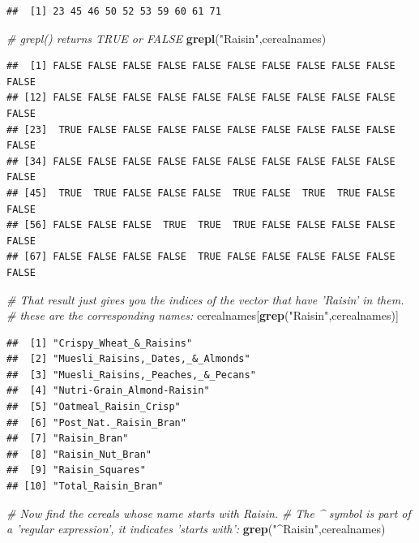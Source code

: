 \documentclass[]{book}
\newenvironment{Shaded}{\begin{snugshade}}{\end{snugshade}}
\newcommand{\CommentTok}[1]{\textcolor[rgb]{0.56,0.35,0.01}{\textit{#1}}}
\newcommand{\KeywordTok}[1]{\textcolor[rgb]{0.13,0.29,0.53}{\textbf{#1}}}
\newcommand{\NormalTok}[1]{#1}
\newcommand{\StringTok}[1]{\textcolor[rgb]{0.31,0.60,0.02}{#1}}
\begin{document}
\begin{verbatim}
##  [1] 23 45 46 50 52 53 59 60 61 71
\end{verbatim}

\begin{Shaded}
\begin{Highlighting}[]
\CommentTok{# grepl() returns TRUE or FALSE}
\KeywordTok{grepl}\NormalTok{(}\StringTok{"Raisin"}\NormalTok{,cerealnames)}
\end{Highlighting}
\end{Shaded}

\begin{verbatim}
##  [1] FALSE FALSE FALSE FALSE FALSE FALSE FALSE FALSE FALSE FALSE FALSE
## [12] FALSE FALSE FALSE FALSE FALSE FALSE FALSE FALSE FALSE FALSE FALSE
## [23]  TRUE FALSE FALSE FALSE FALSE FALSE FALSE FALSE FALSE FALSE FALSE
## [34] FALSE FALSE FALSE FALSE FALSE FALSE FALSE FALSE FALSE FALSE FALSE
## [45]  TRUE  TRUE FALSE FALSE FALSE  TRUE FALSE  TRUE  TRUE FALSE FALSE
## [56] FALSE FALSE FALSE  TRUE  TRUE  TRUE FALSE FALSE FALSE FALSE FALSE
## [67] FALSE FALSE FALSE FALSE  TRUE FALSE FALSE FALSE FALSE FALSE FALSE
\end{verbatim}

\begin{Shaded}
\begin{Highlighting}[]
\CommentTok{# That result just gives you the indices of the vector that have 'Raisin' in them.}
\CommentTok{# these are the corresponding names:}
\NormalTok{cerealnames[}\KeywordTok{grep}\NormalTok{(}\StringTok{"Raisin"}\NormalTok{,cerealnames)]}
\end{Highlighting}
\end{Shaded}

\begin{verbatim}
##  [1] "Crispy_Wheat_&_Raisins"           
##  [2] "Muesli_Raisins,_Dates,_&_Almonds" 
##  [3] "Muesli_Raisins,_Peaches,_&_Pecans"
##  [4] "Nutri-Grain_Almond-Raisin"        
##  [5] "Oatmeal_Raisin_Crisp"             
##  [6] "Post_Nat._Raisin_Bran"            
##  [7] "Raisin_Bran"                      
##  [8] "Raisin_Nut_Bran"                  
##  [9] "Raisin_Squares"                   
## [10] "Total_Raisin_Bran"
\end{verbatim}

\begin{Shaded}
\begin{Highlighting}[]
\CommentTok{# Now find the cereals whose name starts with Raisin.}
\CommentTok{# The ^ symbol is part of a 'regular expression', it indicates 'starts with':}
\KeywordTok{grep}\NormalTok{(}\StringTok{"^Raisin"}\NormalTok{,cerealnames)}
\end{Highlighting}
\end{Shaded}
\end{document}

